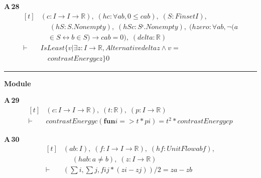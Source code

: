 \noindent\textbf{A\,28}\quad{}
{\footnotesize\[ \begin{aligned}[t]
&(\mathit{c} : \mathit{I} \to \mathit{I} \to \mathbb{R} ),\; (\mathit{hc} : \forall \mathit{a} \mathit{b},0 \leq \mathit{c} \mathit{a} \mathit{b}),\; (\mathit{S} : \mathit{Finset} \mathit{I}),\\
&\quad \; (\mathit{hS} : \mathit{S}.\mathit{Nonempty}),\; (\mathit{hSc} : \mathit{Sᶜ}.\mathit{Nonempty}),\; (\mathit{hzero} : \forall \mathit{a} \mathit{b},\neg (\mathit{a}\\
&\quad \in \mathit{S} \leftrightarrow \mathit{b} \in \mathit{S}) \to \mathit{c} \mathit{a} \mathit{b}=0),\; (\mathit{delta} : \mathbb{R} )\\
\vdash\;&\mathit{IsLeast} \{ \mathit{v} | \exists \mathit{z} : \mathit{I} \to \mathbb{R} ,\mathit{Alternative} \mathit{delta} \mathit{z} \wedge \mathit{v}=\\
&\quad \mathit{contrastEnergy} \mathit{c} \mathit{z}\} 0
\end{aligned} \]}

\vspace{4pt}\noindent\rule{\columnwidth}{0.4pt}\par\vspace{2pt}
\noindent\textbf{Module }\par\vspace{3pt}

\noindent\textbf{A\,29}\quad{}
{\footnotesize\[ \begin{aligned}[t]
&(\mathit{c} : \mathit{I} \to \mathit{I} \to \mathbb{R} ),\; (\mathit{t} : \mathbb{R} ),\; (\mathit{p} : \mathit{I} \to \mathbb{R} )\\
\vdash\;&\mathit{contrastEnergy} \mathit{c} (\mathbf{fun} \mathit{i} => \mathit{t}*\mathit{p} \mathit{i}) = \mathit{t}^{2}*\mathit{contrastEnergy} \mathit{c} \mathit{p}
\end{aligned} \]}

\noindent\textbf{A\,30}\quad{}
{\footnotesize\[ \begin{aligned}[t]
&(\mathit{a} \mathit{b} : \mathit{I}),\; (\mathit{f} : \mathit{I} \to \mathit{I} \to \mathbb{R} ),\; (\mathit{hf} : \mathit{UnitFlow} \mathit{a} \mathit{b} \mathit{f}),\\
&\quad \; (\mathit{hab} : \mathit{a} \neq \mathit{b}),\; (\mathit{z} : \mathit{I} \to \mathbb{R} )\\
\vdash\;&(\textstyle\sum \mathit{i}, \textstyle\sum \mathit{j}, \mathit{f} \mathit{i} \mathit{j}*(\mathit{z} \mathit{i}-\mathit{z} \mathit{j}))/2 = \mathit{z} \mathit{a}-\mathit{z} \mathit{b}
\end{aligned} \]}

